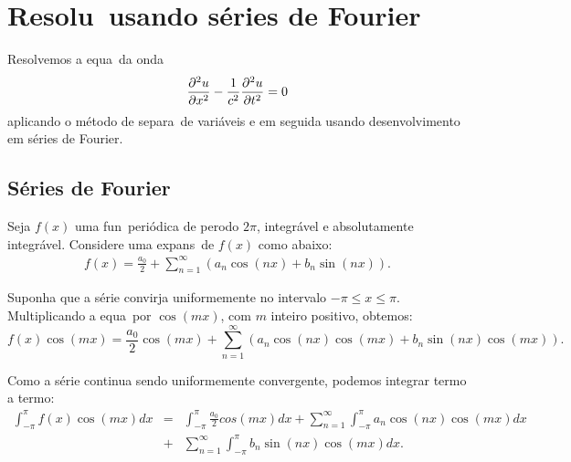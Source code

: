 
\section{Resolu\cao\ usando s\'eries de Fourier }

Resolvemos a equa\cao\ da onda
\begin{eqnarray}
\frac{\partial^{2}u}{\partial x^{2}} - \frac{1}{c^{2}}\frac{\partial^{2}u}{\partial t^{2}} =0
\end{eqnarray}
aplicando o m\'etodo de separa\cao\ de vari\'aveis e em seguida
usando desenvolvimento em s\'eries de Fourier.

\subsection {S\'eries de Fourier}

Seja $f(x)$ uma fun\cao\ peri\'odica de per\ih odo $2\pi$, integr\'avel e absolutamente integr\'avel. Considere uma expans\ao\ de $f(x)$ como abaixo:
\begin{eqnarray}
f(x) = \frac{a_{0}}{2} + \sum_{n=1}^{\infty} (a_{n}\cos (nx) +
b_{n}\sin (nx)).
\end{eqnarray}

Suponha que a s\'erie convirja uniformemente no intervalo $-\pi
\leq x \leq \pi$. Multiplicando a equa\cao\ por $\cos (mx)$, com $m$
inteiro positivo, obtemos:
\[
f(x)\cos (mx) = \frac{a_{0}}{2}\cos (mx) + \sum_{n=1}^{\infty}(a_{n}\cos (nx)\cos (mx) + b_{n}\sin (nx)\cos (mx)).
\]

Como a s\'erie continua sendo uniformemente convergente, podemos
integrar termo a termo:
\begin{eqnarray*}
\int_{-\pi}^{\pi} f(x)\cos (mx)dx &=& \int_{-\pi}^{\pi} \frac{a_{0}}{2}cos (mx)dx +
\sum_{n=1}^{\infty}\int_{-\pi}^{\pi} a_{n}\cos (nx)\cos (mx)dx \\
&+& \sum_{n=1}^{\infty}\int_{-\pi}^{\pi} b_{n}\sin (nx)\cos
(mx)dx.
\end{eqnarray*}

